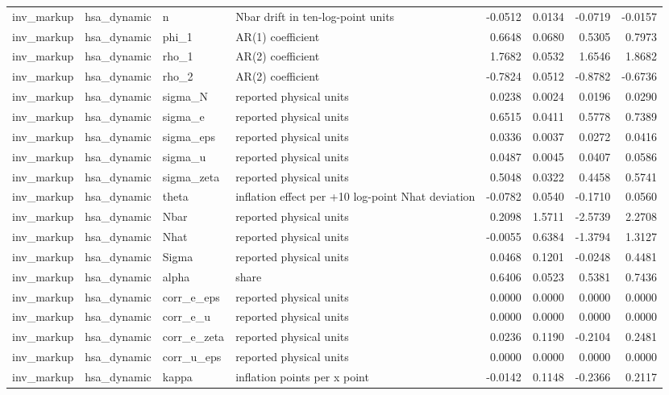 \begin{tabular}{llllrrrr}
inv\_markup & hsa\_dynamic & n & Nbar drift in ten-log-point units & -0.0512 & 0.0134 & -0.0719 & -0.0157 \\
inv\_markup & hsa\_dynamic & phi\_1 & AR(1) coefficient & 0.6648 & 0.0680 & 0.5305 & 0.7973 \\
inv\_markup & hsa\_dynamic & rho\_1 & AR(2) coefficient & 1.7682 & 0.0532 & 1.6546 & 1.8682 \\
inv\_markup & hsa\_dynamic & rho\_2 & AR(2) coefficient & -0.7824 & 0.0512 & -0.8782 & -0.6736 \\
inv\_markup & hsa\_dynamic & sigma\_N & reported physical units & 0.0238 & 0.0024 & 0.0196 & 0.0290 \\
inv\_markup & hsa\_dynamic & sigma\_e & reported physical units & 0.6515 & 0.0411 & 0.5778 & 0.7389 \\
inv\_markup & hsa\_dynamic & sigma\_eps & reported physical units & 0.0336 & 0.0037 & 0.0272 & 0.0416 \\
inv\_markup & hsa\_dynamic & sigma\_u & reported physical units & 0.0487 & 0.0045 & 0.0407 & 0.0586 \\
inv\_markup & hsa\_dynamic & sigma\_zeta & reported physical units & 0.5048 & 0.0322 & 0.4458 & 0.5741 \\
inv\_markup & hsa\_dynamic & theta & inflation effect per +10 log-point Nhat deviation & -0.0782 & 0.0540 & -0.1710 & 0.0560 \\
inv\_markup & hsa\_dynamic & Nbar & reported physical units & 0.2098 & 1.5711 & -2.5739 & 2.2708 \\
inv\_markup & hsa\_dynamic & Nhat & reported physical units & -0.0055 & 0.6384 & -1.3794 & 1.3127 \\
inv\_markup & hsa\_dynamic & Sigma & reported physical units & 0.0468 & 0.1201 & -0.0248 & 0.4481 \\
inv\_markup & hsa\_dynamic & alpha & share & 0.6406 & 0.0523 & 0.5381 & 0.7436 \\
inv\_markup & hsa\_dynamic & corr\_e\_eps & reported physical units & 0.0000 & 0.0000 & 0.0000 & 0.0000 \\
inv\_markup & hsa\_dynamic & corr\_e\_u & reported physical units & 0.0000 & 0.0000 & 0.0000 & 0.0000 \\
inv\_markup & hsa\_dynamic & corr\_e\_zeta & reported physical units & 0.0236 & 0.1190 & -0.2104 & 0.2481 \\
inv\_markup & hsa\_dynamic & corr\_u\_eps & reported physical units & 0.0000 & 0.0000 & 0.0000 & 0.0000 \\
inv\_markup & hsa\_dynamic & kappa & inflation points per x point & -0.0142 & 0.1148 & -0.2366 & 0.2117 \\

\end{tabular}
